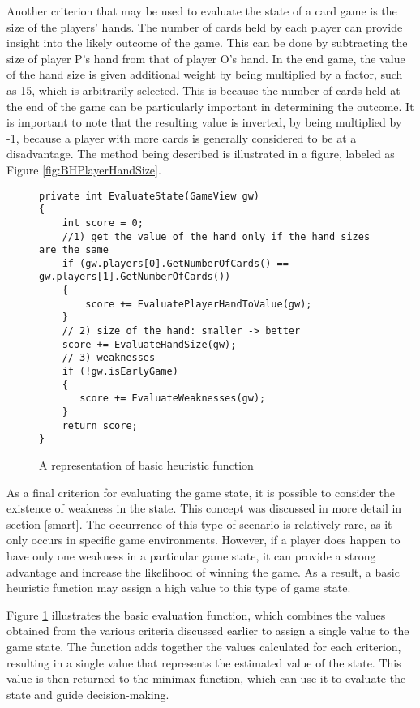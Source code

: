 Another criterion that may be used to evaluate the state of a card game is the size of the players' hands. The number of cards held by each player can provide insight into the likely outcome of the game. This can be done by subtracting the size of player P's hand from that of player O's hand. In the end game, the value of the hand size is given additional weight by being multiplied by a factor, such as 15, which is arbitrarily selected. This is because the number of cards held at the end of the game can be particularly important in determining the outcome. It is important to note that the resulting value is inverted, by being multiplied by -1, because a player with more cards is generally considered to be at a disadvantage. The method being described is illustrated in a figure, labeled as Figure \ref{fig:BHPlayerHandSize}.

\begin{figure}[h]
\captionsetup{justification=centering}
\begin{lstlisting}[frame=single]
private int EvaluateState(GameView gw)
{
    int score = 0;
    //1) get the value of the hand only if the hand sizes are the same
    if (gw.players[0].GetNumberOfCards() == gw.players[1].GetNumberOfCards())
    {
        score += EvaluatePlayerHandToValue(gw);
    }
    // 2) size of the hand: smaller -> better 
    score += EvaluateHandSize(gw);
    // 3) weaknesses 
    if (!gw.isEarlyGame)
    {
       score += EvaluateWeaknesses(gw);
    }
    return score;
}
\end{lstlisting}
\caption{A representation of basic heuristic function}
\label{fig:basicEval}
\end{figure}

As a final criterion for evaluating the game state, it is possible to consider the existence of weakness in the state. This concept was discussed in more detail in section \ref{smart}. The occurrence of this type of scenario is relatively rare, as it only occurs in specific game environments. However, if a player does happen to have only one weakness in a particular game state, it can provide a strong advantage and increase the likelihood of winning the game. As a result, a basic heuristic function may assign a high value to this type of game state.

Figure \ref{fig:basicEval} illustrates the basic evaluation function, which combines the values obtained from the various criteria discussed earlier to assign a single value to the game state. The function adds together the values calculated for each criterion, resulting in a single value that represents the estimated value of the state. This value is then returned to the minimax function, which can use it to evaluate the state and guide decision-making.

